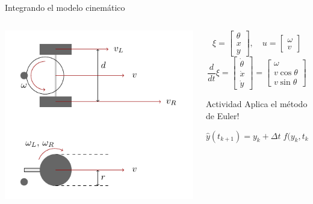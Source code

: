\documentclass[presentation,aspectratio=169]{beamer}
\begin{document}
\begin{frame}[label={sec:orgfbc5058}]{Integrando el modelo cinemático}
\small

\begin{columns}
\begin{column}{0.4\columnwidth}
\begin{center}
 \includegraphics[width=1.0\linewidth]{../figures/unicycle-model-details}
\end{center}
\end{column}

\begin{column}{0.6\columnwidth}
\[ \xi = \begin{bmatrix} \theta\\x\\y \end{bmatrix},   \quad u = \begin{bmatrix} \omega\\v \end{bmatrix}\]
\[\frac{d}{dt} \xi = \begin{bmatrix} \dot{\theta}\\\dot{x}\\\dot{y} \end{bmatrix} = \begin{bmatrix} \omega\\ v\cos\theta\\v\sin\theta\end{bmatrix} \]

\pause

\alert{Actividad} Aplica el método de Euler!

\[\hat{y}(t_{k+1}) = y_k + \Delta t \; f\big(y_k, t_k, u(t_k)\big). \]
\end{column}
\end{columns}
\end{frame}
\end{document}
